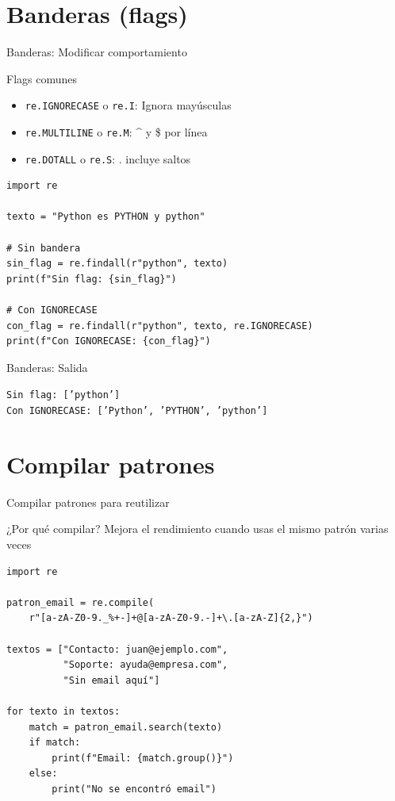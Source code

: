 \documentclass{beamer}
\begin{document}
\section{Banderas (flags)}

\begin{frame}[fragile]{Banderas: Modificar comportamiento \faFlag}
\begin{conceptbox}{Flags comunes}
\small
\begin{itemize}
    \item[\faFont] \texttt{re.IGNORECASE} o \texttt{re.I}: Ignora mayúsculas
    \item[\faAlignJustify] \texttt{re.MULTILINE} o \texttt{re.M}: \^{} y \$ por línea
    \item[\faEllipsisH] \texttt{re.DOTALL} o \texttt{re.S}: . incluye saltos
\end{itemize}
\end{conceptbox}

\begin{lstlisting}
import re

texto = "Python es PYTHON y python"

# Sin bandera
sin_flag = re.findall(r"python", texto)
print(f"Sin flag: {sin_flag}")

# Con IGNORECASE
con_flag = re.findall(r"python", texto, re.IGNORECASE)
print(f"Con IGNORECASE: {con_flag}")
\end{lstlisting}
\end{frame}

\begin{frame}[fragile]{Banderas: Salida \faArrowCircleRight}
\begin{tcolorbox}[colback=green!10,colframe=green,title={\small\faArrowCircleRight \ Salida},coltitle=fg0,left=3pt,right=3pt,top=3pt,bottom=3pt,boxsep=2pt]
\small\texttt{Sin flag: ['python']\\
Con IGNORECASE: ['Python', 'PYTHON', 'python']}
\end{tcolorbox}
\end{frame}

\section{Compilar patrones}

\begin{frame}[fragile]{Compilar patrones para reutilizar \faSync}
\begin{conceptbox}{¿Por qué compilar?}
Mejora el rendimiento cuando usas el mismo patrón varias veces
\end{conceptbox}

\begin{lstlisting}
import re

patron_email = re.compile(
    r"[a-zA-Z0-9._%+-]+@[a-zA-Z0-9.-]+\.[a-zA-Z]{2,}")

textos = ["Contacto: juan@ejemplo.com",
          "Soporte: ayuda@empresa.com",
          "Sin email aquí"]

for texto in textos:
    match = patron_email.search(texto)
    if match:
        print(f"Email: {match.group()}")
    else:
        print("No se encontró email")
\end{lstlisting}
\end{frame}
\end{document}
